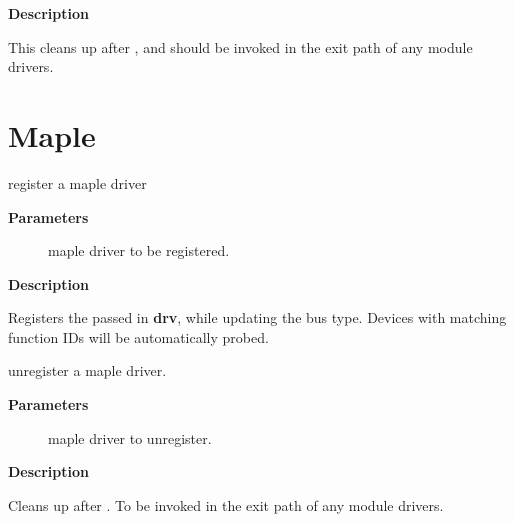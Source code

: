 \documentclass[a4paper,8pt,english]{sphinxmanual}
\begin{document}
\textbf{Description}

This cleans up after {\hyperref[sh/index:c.superhyway_register_driver]{\emph{}}}, and should be invoked in
the exit path of any module drivers.


\section{Maple}
\label{sh/index:maple}

\begin{fulllineitems}
\label{sh/index:c.maple_driver_register}
register a maple driver

\end{fulllineitems}


\textbf{Parameters}
\begin{description}
\item[{}] \leavevmode
maple driver to be registered.

\end{description}

\textbf{Description}

Registers the passed in \textbf{drv}, while updating the bus type.
Devices with matching function IDs will be automatically probed.

\begin{fulllineitems}
\label{sh/index:c.maple_driver_unregister}
unregister a maple driver.

\end{fulllineitems}


\textbf{Parameters}
\begin{description}
\item[{}] \leavevmode
maple driver to unregister.

\end{description}

\textbf{Description}

Cleans up after {\hyperref[sh/index:c.maple_driver_register]{\emph{}}}. To be invoked in the exit
path of any module drivers.
\end{document}
